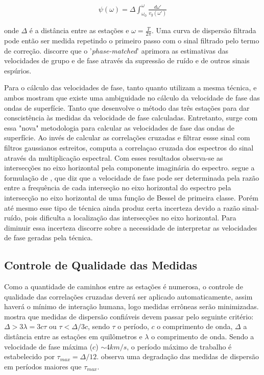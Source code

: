 \documentclass[paper,twocolumn]{geophysics}
\begin{document}
\begin{eqnarray}
\psi(\omega) = \Delta \int_{\omega_{0}}^{\omega} \frac{{d\omega}'}{v_{g}({\omega}')}
\end{eqnarray}

onde $\Delta$ é a distância entre as estações e $\omega = \frac{T}{2\pi}$. Uma curva de dispersão filtrada pode então ser medida repetindo o primeiro passo com o sinal filtrado pelo termo de correção. \cite{levshin_peculiarities_1992} discorre que o '\textit{phase-matched}' aprimora as estimativas das velocidades de grupo e de fase através da supressão de ruído e de outros sinais espúrios.

Para o cálculo das velocidades de fase, tanto \cite{bensen_processing_2007} quanto \cite{lin_surface_2008} utilizam a mesma técnica, e ambos mostram que existe uma ambiguidade no cálculo da velocidade de fase das ondas de superfície. Tanto que \cite{lin_surface_2008} desenvolve o método das três estações para dar conscistência às medidas da velocidade de fase calculadas. Entretanto, \cite{ekstrom_determination_2009} surge com essa "nova" metodologia para calcular as velocidades de fase das ondas de superfície. Ao invés de calcular as correlações cruzadas e filtrar essse sinal com filtros gaussianos estreitos, \cite{ekstrom_determination_2009} computa a correlaçao cruzada dos espectros do sinal através da multiplicação espectral. Com esses resultados observa-se as intersecções no eixo horizontal pela componente imaginária do espectro. \cite{ekstrom_determination_2009} segue a formulação de \cite{aki_space_1957}, que diz que a velocidade de fase pode ser determinada pela razão entre a frequência de cada interseção no eixo horizontal do espectro pela intersecção no eixo horizontal de uma função de Bessel de primeira classe. Porém até mesmo esse tipo de técnica ainda produz certa incerteza devido a razão sinal-ruído, pois dificulta a localização das intersecções no eixo horizontal. Para diminuir essa incerteza \cite{ekstrom_determination_2009} discorre sobre a necessidade de interpretar as velocidades de fase geradas pela técnica.

\subsection*{Controle de Qualidade das Medidas}

Como a quantidade de caminhos entre as estações é numerosa, o controle de qualidade das correlações cruzadas deverá ser aplicado automaticamente, assim haverá o mínimo de interação humana, logo medidas errôneas serão minimizadas. \cite{bensen_processing_2007} mostra que medidas de dispersão confiáveis devem passar pelo seguinte critério: $\Delta > 3\lambda = 3c\tau$ ou $\tau < \Delta/3c$, sendo $\tau$ o período, $c$ o comprimento de onda, $\Delta$ a distância entre as estações em quilômetros e $\lambda$ o comprimento de onda. Sendo a velocidade de fase máxima ($c$) $\sim 4 km/s$, o período máximo de trabalho é estabelecido por $\tau_{max} = \Delta/12$. \cite{bensen_processing_2007} observa uma degradação das medidas de dispersão em períodos maiores que $\tau_{max}$. 
\end{document}
